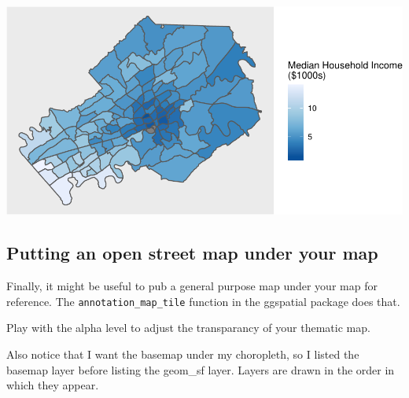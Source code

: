 \documentclass[]{article}
\newenvironment{Shaded}{\begin{snugshade}}{\end{snugshade}}
\newcommand{\CharTok}[1]{\textcolor[rgb]{0.31,0.60,0.02}{#1}}
\newcommand{\DataTypeTok}[1]{\textcolor[rgb]{0.13,0.29,0.53}{#1}}
\newcommand{\DecValTok}[1]{\textcolor[rgb]{0.00,0.00,0.81}{#1}}
\newcommand{\KeywordTok}[1]{\textcolor[rgb]{0.13,0.29,0.53}{\textbf{#1}}}
\newcommand{\NormalTok}[1]{#1}
\newcommand{\OperatorTok}[1]{\textcolor[rgb]{0.81,0.36,0.00}{\textbf{#1}}}
\newcommand{\OtherTok}[1]{\textcolor[rgb]{0.56,0.35,0.01}{#1}}
\newcommand{\StringTok}[1]{\textcolor[rgb]{0.31,0.60,0.02}{#1}}
\begin{document}
\includegraphics{lab02_rmarkdown_tutorial_files/figure-latex/unnamed-chunk-5-1.pdf}

\hypertarget{putting-an-open-street-map-under-your-map}{%
\subsection{Putting an open street map under your
map}\label{putting-an-open-street-map-under-your-map}}

Finally, it might be useful to pub a general purpose map under your map
for reference. The \texttt{annotation\_map\_tile} function in the
ggspatial package does that.

Play with the alpha level to adjust the transparancy of your thematic
map.

Also notice that I want the basemap under my choropleth, so I listed the
basemap layer before listing the geom\_sf layer. Layers are drawn in the
order in which they appear.

\begin{Shaded}
\end{Shaded}
\end{document}
